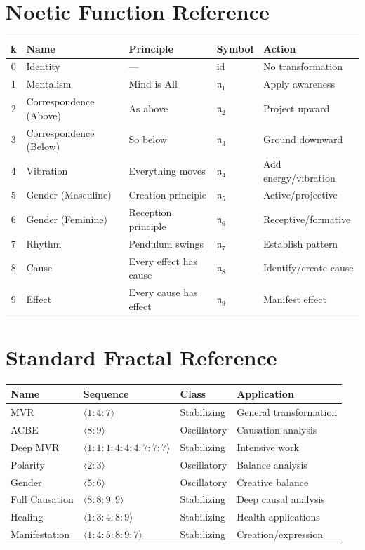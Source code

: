 \documentclass[11pt,twoside,openright]{book}
\theoremstyle{definition}
\theoremstyle{plain}
\theoremstyle{remark}
\newcommand{\id}{\mathrm{id}}
\begin{document}
\section{Noetic Function Reference}

\begin{center}
\begin{tabular}{cllll}
\toprule
\textbf{k} & \textbf{Name} & \textbf{Principle} & \textbf{Symbol} & \textbf{Action} \\
\midrule
0 & Identity & --- & $\id$ & No transformation \\
1 & Mentalism & Mind is All & $\mathfrak{n}_1$ & Apply awareness \\
2 & Correspondence (Above) & As above & $\mathfrak{n}_2$ & Project upward \\
3 & Correspondence (Below) & So below & $\mathfrak{n}_3$ & Ground downward \\
4 & Vibration & Everything moves & $\mathfrak{n}_4$ & Add energy/vibration \\
5 & Gender (Masculine) & Creation principle & $\mathfrak{n}_5$ & Active/projective \\
6 & Gender (Feminine) & Reception principle & $\mathfrak{n}_6$ & Receptive/formative \\
7 & Rhythm & Pendulum swings & $\mathfrak{n}_7$ & Establish pattern \\
8 & Cause & Every effect has cause & $\mathfrak{n}_8$ & Identify/create cause \\
9 & Effect & Every cause has effect & $\mathfrak{n}_9$ & Manifest effect \\
\bottomrule
\end{tabular}
\end{center}

\section{Standard Fractal Reference}

\begin{center}
\begin{tabular}{llll}
\toprule
\textbf{Name} & \textbf{Sequence} & \textbf{Class} & \textbf{Application} \\
\midrule
MVR & $\langle 1:4:7 \rangle$ & Stabilizing & General transformation \\
ACBE & $\langle 8:9 \rangle$ & Oscillatory & Causation analysis \\
Deep MVR & $\langle 1:1:1:4:4:4:7:7:7 \rangle$ & Stabilizing & Intensive work \\
Polarity & $\langle 2:3 \rangle$ & Oscillatory & Balance analysis \\
Gender & $\langle 5:6 \rangle$ & Oscillatory & Creative balance \\
Full Causation & $\langle 8:8:9:9 \rangle$ & Stabilizing & Deep causal analysis \\
Healing & $\langle 1:3:4:8:9 \rangle$ & Stabilizing & Health applications \\
Manifestation & $\langle 1:4:5:8:9:7 \rangle$ & Stabilizing & Creation/expression \\
\bottomrule
\end{tabular}
\end{center}
\end{document}
